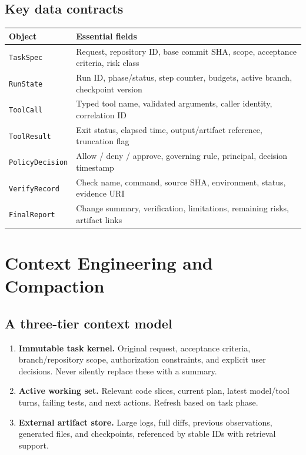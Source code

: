 \documentclass[10pt,letterpaper]{article}
\newcommand{\term}[1]{\textbf{\color{DeepBlue}#1}}
\newcommand{\code}[1]{\texttt{#1}}
\begin{document}
\subsection{Key data contracts}
\begin{tabularx}{\textwidth}{L{3.0cm} Y}
\toprule
\textbf{Object} & \textbf{Essential fields} \\
\midrule
\code{TaskSpec} & Request, repository ID, base commit SHA, scope, acceptance criteria, risk class \\
\code{RunState} & Run ID, phase/status, step counter, budgets, active branch, checkpoint version \\
\code{ToolCall} & Typed tool name, validated arguments, caller identity, correlation ID \\
\code{ToolResult} & Exit status, elapsed time, output/artifact reference, truncation flag \\
\code{PolicyDecision} & Allow / deny / approve, governing rule, principal, decision timestamp \\
\code{VerifyRecord} & Check name, command, source SHA, environment, status, evidence URI \\
\code{FinalReport} & Change summary, verification, limitations, remaining risks, artifact links \\
\bottomrule
\end{tabularx}

\section{Context Engineering and Compaction}\label{sec:context}
\subsection{A three-tier context model}
\begin{enumerate}
\item \term{Immutable task kernel.} Original request, acceptance criteria, branch/repository scope, authorization constraints, and explicit user decisions. Never silently replace these with a summary.
\item \term{Active working set.} Relevant code slices, current plan, latest model/tool turns, failing tests, and next actions. Refresh based on task phase.
\item \term{External artifact store.} Large logs, full diffs, previous observations, generated files, and checkpoints, referenced by stable IDs with retrieval support.
\end{enumerate}
\end{document}
